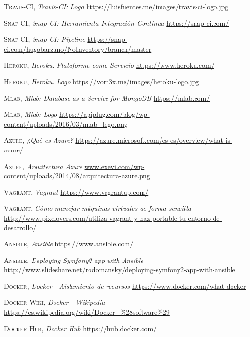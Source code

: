 \documentclass[a4paper,11pt]{book}
\begin{document}
\begin{thebibliography}{aaaa}
 \textsc{Travis-CI},
\textit{Travis-CI: Logo}
\url{https://luisfuentes.me/images/travis-ci-logo.jpg}


 \textsc{Snap-CI},
\textit{Snap-CI: Herramienta Integración Continua}
\url{https://snap-ci.com/}

 \textsc{Snap-CI},
\textit{Snap-CI: Pipeline}
\url{https://snap-ci.com/hugobarzano/NoInventory/branch/master}


 \textsc{Heroku},
\textit{Heroku: Plataforma como Servicio}
\url{https://www.heroku.com/}

 \textsc{Heroku},
\textit{Heroku: Logo}
\url{https://vort3x.me/images/heroku-logo.jpg}

 \textsc{Mlab},
\textit{Mlab: Database-as-a-Service for MongoDB}
\url{https://mlab.com/}

 \textsc{Mlab},
\textit{Mlab: Logo}
\url{https://apiplug.com/blog/wp-content/uploads/2016/03/mlab_logo.png}



 \textsc{Azure},
\textit{¿Qué es Azure?}
\url{https://azure.microsoft.com/es-es/overview/what-is-azure/} 

 \textsc{Azure},
\textit{Arquitectura Azure}
\url{www.exevi.com/wp-content/uploads/2014/08/arquitectura-azure.png} 



 \textsc{Vagrant},
\textit{Vagrant}
\url{https://www.vagrantup.com/} 

 \textsc{Vagrant},
\textit{Cómo manejar máquinas virtuales de forma sencilla}
\url{http://www.pixelovers.com/utiliza-vagrant-y-haz-portable-tu-entorno-de-desarrollo/} 


 \textsc{Ansible},
\textit{Ansible}
\url{https://www.ansible.com/} 

 \textsc{Ansible},
\textit{Deploying Symfony2 app with Ansible}
\url{http://www.slideshare.net/rodomansky/deploying-symfony2-app-with-ansible} 


 \textsc{Docker},
\textit{Docker - Aislamiento de recursos}
\url{https://www.docker.com/what-docker} 

 \textsc{Docker-Wiki},
\textit{Docker - Wikipedia}
\url{https://es.wikipedia.org/wiki/Docker_\%28software\%29} 


 \textsc{Docker Hub},
\textit{Docker Hub}
\url{https://hub.docker.com/} 


\end{thebibliography}
\end{document}
